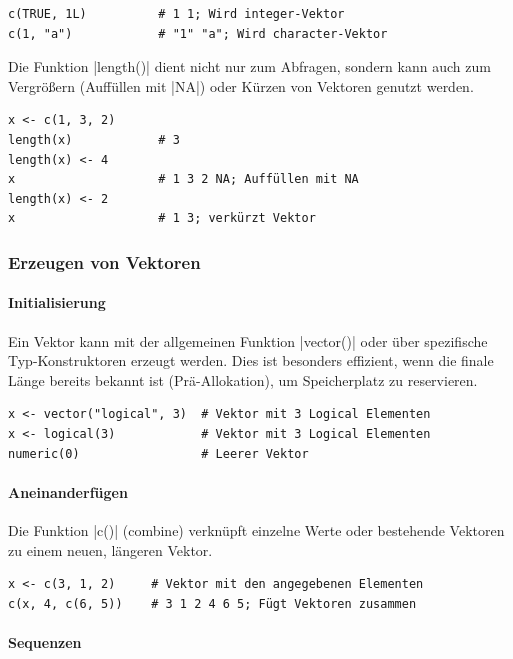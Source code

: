 \documentclass[10pt,twocolumn]{scrartcl}
\renewcommand{\lstinline}{\mycoloredinline}
\begin{document}
\begin{lstlisting}
c(TRUE, 1L)          # 1 1; Wird integer-Vektor
c(1, "a")            # "1" "a"; Wird character-Vektor
\end{lstlisting}

Die Funktion \lstinline|length()| dient nicht nur zum Abfragen, sondern kann auch zum Vergrößern (Auffüllen mit \lstinline|NA|) oder Kürzen von Vektoren genutzt werden.

\begin{lstlisting}
x <- c(1, 3, 2)
length(x)            # 3
length(x) <- 4
x                    # 1 3 2 NA; Auffüllen mit NA
length(x) <- 2
x                    # 1 3; verkürzt Vektor
\end{lstlisting}

\subsubsection{Erzeugen von Vektoren}

\paragraph{Initialisierung}

Ein Vektor kann mit der allgemeinen Funktion \lstinline|vector()| oder über spezifische Typ-Konstruktoren erzeugt werden. Dies ist besonders effizient, wenn die finale Länge bereits bekannt ist (Prä-Allokation), um Speicherplatz zu reservieren.

\begin{lstlisting}
x <- vector("logical", 3)  # Vektor mit 3 Logical Elementen
x <- logical(3)            # Vektor mit 3 Logical Elementen
numeric(0)                 # Leerer Vektor
\end{lstlisting}

\paragraph{Aneinanderfügen}

Die Funktion \lstinline|c()| (combine) verknüpft einzelne Werte oder bestehende Vektoren zu einem neuen, längeren Vektor.

\begin{lstlisting}
x <- c(3, 1, 2)     # Vektor mit den angegebenen Elementen
c(x, 4, c(6, 5))    # 3 1 2 4 6 5; Fügt Vektoren zusammen
\end{lstlisting}

\paragraph{Sequenzen}
\end{document}
